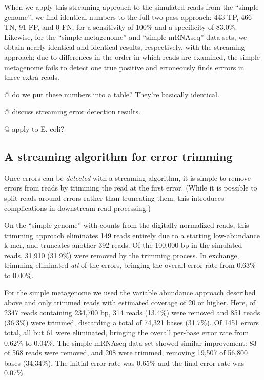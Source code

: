 \documentclass{article}
\begin{document}

When we apply this streaming approach to the simulated reads from the
``simple genome'', we find identical numbers to the full two-pass
approach: 443 TP, 466 TN, 91 FP, and 0 FN, for a sensitivity of 100\%
and a specificity of 83.0\%.  Likewise, for the ``simple metagenome''
and ``simple mRNAseq'' data sets, we obtain nearly identical and
identical results, respectively, with the streaming approach; due to
differences in the order in which reads are examined, the simple
metagenome fails to detect one true positive and erroneously finds
errrors in three extra reads.

@ do we put these numbers into a table? They're basically identical.

@ discuss streaming error detection results.

@ apply to E. coli?

\subsection{A streaming algorithm for error trimming}

Once errors can be {\em detected} with a streaming algorithm, it is simple
to remove errors from reads by trimming the read at the first error.
(While it is possible to split reads around errors rather than
truncating them, this introduces complications in downstream read
processing.)


On the ``simple genome'' with counts from the digitally normalized
reads, this trimming approach eliminates 149 reads entirely due to a
starting low-abundance k-mer, and truncates another 392 reads.  Of the
100,000 bp in the simulated reads, 31,910 (31.9\%) were removed by the
trimming process.  In exchange, trimming eliminated {\em all} of the
errors, bringing the overall error rate from 0.63\% to 0.00\%.


For the simple metagenome we used the variable abundance approach
described above and only trimmed reads with estimated coverage of 20
or higher.  Here, of 2347 reads containing 234,700 bp, 314 reads
(13.4\%) were removed and 851 reads (36.3\%) were trimmed, discarding
a total of 74,321 bases (31.7\%).  Of 1451 errors total, all but 61
were eliminated, bringing the overall per-base error rate from 0.62\% to
0.04\%.  The simple mRNAseq data set showed similar improvement: 83 of
568 reads were removed, and 208 were trimmed, removing 19,507 of
56,800 bases (34.34\%).  The initial error rate was 0.65\% and the
final error rate was 0.07\%.
\end{document}
